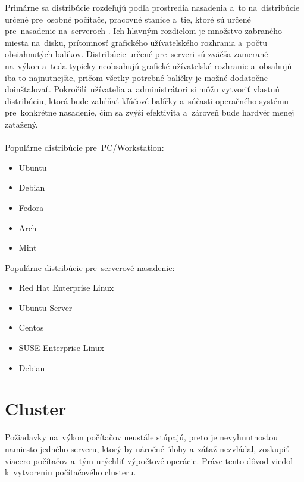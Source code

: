 Primárne sa distribúcie rozdeľujú podľa prostredia nasadenia a~to na~distribúcie určené pre~osobné počítače, pracovné stanice a~tie, ktoré sú určené pre~nasadenie na~serveroch \cite{linux-distros}. Ich hlavným rozdielom je množstvo zabraného miesta na~disku, prítomnosť grafického užívateľského rozhrania a~počtu obsiahnutých balíkov. Distribúcie určené pre~serveri sú zväčša zamerané na~výkon a~teda typicky neobsahujú grafické užívateľské rozhranie a~obsahujú iba to najnutnejšie, pričom všetky potrebné balíčky je možné dodatočne doinštalovať. \mbox{Pokročilí}~užívatelia a~administrátori si môžu vytvoriť vlastnú distribúciu, ktorá bude zahŕňať kľúčové balíčky a~súčasti operačného systému pre~konkrétne nasadenie, čím sa zvýši efektivita a~zároveň bude hardvér menej zaťažený.
\\\\
\noindent Populárne distribúcie pre~PC/Workstation:
\begin{itemize}
	\item Ubuntu
	\item Debian
	\item Fedora
	\item Arch
	\item Mint
\end{itemize}
\noindent Populárne distribúcie pre~serverové nasadenie:
\begin{itemize}
	\item Red Hat Enterprise Linux
	\item Ubuntu Server
	\item Centos
	\item SUSE Enterprise Linux
	\item Debian
\end{itemize}
\section{Cluster}
Požiadavky na~výkon počítačov neustále stúpajú, preto je nevyhnutnosťou namiesto jedného serveru, ktorý by náročné úlohy a~záťaž nezvládal, zoskupiť viacero počítačov a~tým urýchliť výpočtové operácie. Práve tento dôvod viedol k~vytvoreniu počítačového clusteru. 


